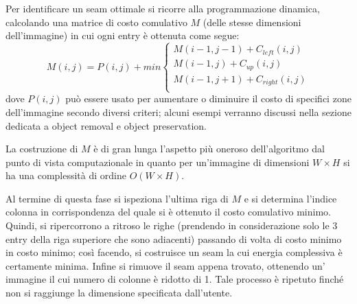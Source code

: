 \documentclass[12pt,a4paper]{report}
\theoremstyle{plain}
\theoremstyle{definition}
\begin{document}
Per identificare un seam ottimale si ricorre alla programmazione dinamica, calcolando una matrice di costo comulativo $M$ (delle stesse dimensioni dell'immagine) in cui ogni entry è ottenuta come segue:
\[
M(i,j) = P(i,j) + min\begin{cases}
 M (i - 1, j - 1) + C_{left} (i, j) \\
 M (i - 1, j) + C_{up}(i, j) \\
 M (i - 1, j + 1) + C_{right}(i, j)\\
\end{cases}
\]
dove $P(i,j)$ può essere usato per aumentare o diminuire il costo di specifici zone dell'immagine secondo diversi criteri; alcuni esempi verranno discussi nella sezione dedicata a object removal e object preservation.

La costruzione di $M$ è di gran lunga l'aspetto più oneroso dell'algoritmo dal punto di vista computazionale in quanto per un'immagine di dimensioni $W \times H$ si ha una complessità di ordine $O(W\times H)$.

Al termine di questa fase si ispeziona l'ultima riga di $M$ e si determina l'indice colonna in corrispondenza del quale si è ottenuto il costo comulativo minimo. Quindi, si ripercorrono a ritroso le righe (prendendo in considerazione solo le 3 entry della riga superiore che sono adiacenti) passando di volta di costo minimo in costo minimo; così facendo, si costruisce un seam la cui energia complessiva è certamente minima. Infine si rimuove il seam appena trovato, ottenendo un' immagine il cui numero di colonne è ridotto di 1. Tale processo è ripetuto finché non si raggiunge la dimensione specificata dall'utente.
\end{document}
